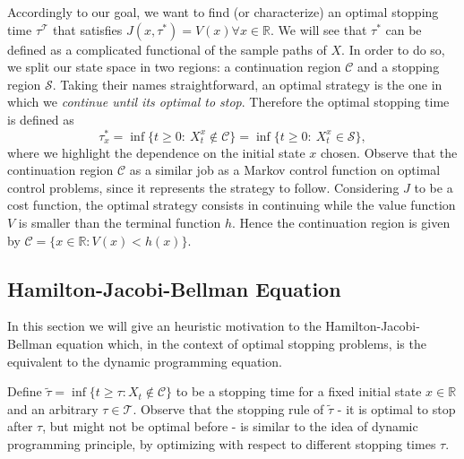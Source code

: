 Accordingly to our goal, we want to find (or characterize) an optimal stopping time $\tau^\mathcal{T}$ that satisfies $J(x,\tau^*)=V(x) \forall x \in \mathds{R}$. We will see that $\tau^*$ can be defined as a complicated functional of the sample paths of $X$. In order to do so, we split our state space in two regions: a continuation region $\mathcal{C}$ and a stopping region $\mathcal{S}$. Taking their names straightforward, an optimal strategy is the one in which we \textit{continue until its optimal to stop}. Therefore the optimal stopping time is defined as
\begin{equation}
\tau_x^*=\inf\{ t \geq0: \ X^x_t \notin \mathcal{C} \}
=\inf\{ t \geq0: \ X^x_t \in \mathcal{S} \},
\label{stop}
\end{equation}
where we highlight the dependence on the initial state $x$ chosen. Observe that the continuation region $\mathcal{C}$ as a similar job as a Markov control function on optimal control problems, since it represents the strategy to follow.
Considering $J$ to be a cost function, the optimal strategy consists in continuing while the value function $V$ is smaller than the terminal function $h$. Hence the continuation region is given by $\mathcal{C}=\{ x\in \mathds{R}: V(x)<h(x) \}$.


\subsection{Hamilton-Jacobi-Bellman Equation}

In this section we will give an heuristic motivation to the Hamilton-Jacobi-Bellman equation which, in the context of optimal stopping problems, is the equivalent to the dynamic programming equation.

Define $\tilde{\tau}= \inf \{ t \geq \tau: X_t \notin \mathcal{C} \}$ to be a stopping time for a fixed initial state $x \in \mathds{R}$ and an arbitrary $\tau \in \mathcal{T}$.
Observe that the stopping rule of $\tilde{\tau}$ - it is optimal to stop after $\tau$, but might not be optimal before - is similar to the idea of dynamic programming principle, by optimizing with respect to different stopping times $\tau$.

